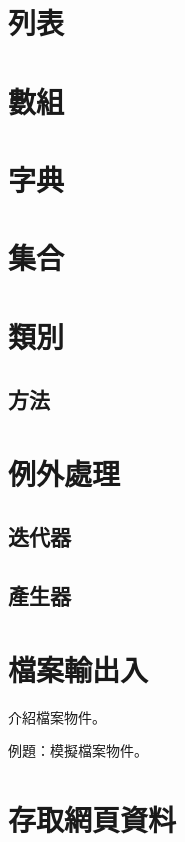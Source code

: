 \documentclass[a4paper,12pt]{book}
\theoremstyle{definition}
\begin{document}
\chapter{列表}
%
\label{c:list}

\chapter{數組}
%
\label{c:tuple}

\chapter{字典}
%
\label{c:dict}

\chapter{集合}
%
\label{c:set}

\chapter{類別}
%
\label{c:class}

\section{方法}

\chapter{例外處理}
%
\label{c:exception}

\section{迭代器}

\section{產生器}

\chapter{檔案輸出入}
%
\label{c:file}

介紹檔案物件。

例題：模擬檔案物件。

\chapter{存取網頁資料}
%
\label{c:web}
\end{document}

